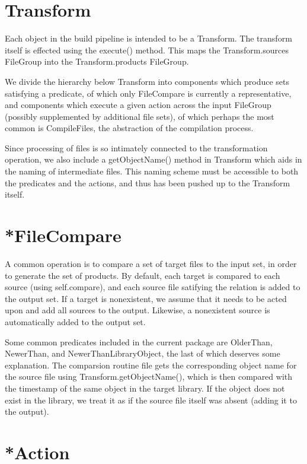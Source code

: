 \section{Transform}

Each object in the build pipeline is intended to be a Transform. The transform itself is effected using the execute()
method. This maps the Transform.sources FileGroup into the Transform.products FileGroup.

We divide the hierarchy below Transform into components which produce sets satisfying a predicate, of which only
FileCompare is currently a representative, and components which execute a given action across the input FileGroup
(possibly supplemented by additional file sets), of which perhaps the most common is CompileFiles, the abstraction of
the compilation process.

Since processing of files is so intimately connected to the transformation operation, we also include a getObjectName()
method in Transform which aids in the naming of intermediate files. This naming scheme must be accessible to both the
predicates and the actions, and thus has been pushed up to the Transform itself.

\section{*FileCompare}

A common operation is to compare a set of target files to the input set, in order to generate the set of products. By
default, each target is compared to each source (using self.compare), and each source file satifying the relation is
added to the output set. If a target is nonexistent, we assume that it needs to be acted upon and add all sources to the
output. Likewise, a nonexistent source is automatically added to the output set.

Some common predicates included in the current package are OlderThan, NewerThan, and NewerThanLibraryObject, the last of
which deserves some explanation. The comparsion routine file gets the corresponding object name for the source file
using Transform.getObjectName(), which is then compared with the timestamp of the same object in the target library. If
the object does not exist in the library, we treat it as if the source file itself was absent (adding it to the output).

\section{*Action}

